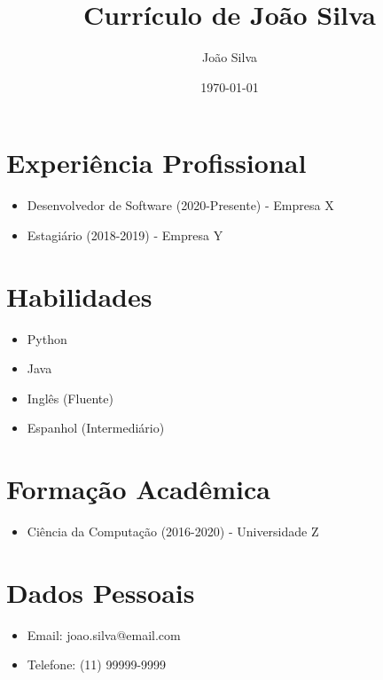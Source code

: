\documentclass{article}
\title{Currículo de João Silva}
\author{João Silva}
\date{\today}
\begin{document}
\maketitle

\section{Experiência Profissional}
\begin{itemize}
    \item Desenvolvedor de Software (2020-Presente) - Empresa X
    \item Estagiário (2018-2019) - Empresa Y
\end{itemize}

\section{Habilidades}
\begin{itemize}
    \item Python
    \item Java
    \item Inglês (Fluente)
    \item Espanhol (Intermediário)
\end{itemize}

\section{Formação Acadêmica}
\begin{itemize}
    \item Ciência da Computação (2016-2020) - Universidade Z
\end{itemize}

\section{Dados Pessoais}
\begin{itemize}
    \item Email: joao.silva@email.com
    \item Telefone: (11) 99999-9999
\end{itemize}
\end{document}
